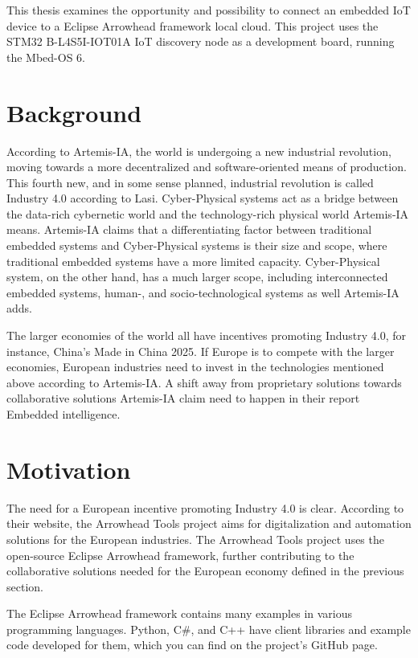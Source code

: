 This thesis examines the opportunity and possibility to connect an embedded IoT device to a Eclipse Arrowhead framework local cloud.
This project uses the STM32 B-L4S5I-IOT01A IoT discovery node as a development board, running the Mbed-OS 6. 
\section{Background}
According to Artemis-IA, the world is undergoing a new industrial revolution, moving towards a more decentralized and software-oriented means of production\cite{Artemis2021}.
This fourth new, and in some sense planned, industrial revolution is called Industry 4.0 according to Lasi\cite{Lasi2014}. 
Cyber-Physical systems act as a bridge between the data-rich cybernetic world and the technology-rich physical world Artemis-IA means\cite{Artemis2021}.
Artemis-IA claims that a differentiating factor between traditional embedded systems and Cyber-Physical systems is their size and scope, where traditional embedded systems have a more limited capacity.
Cyber-Physical system, on the other hand, has a much larger scope, including interconnected embedded systems, human-, and socio-technological systems as well Artemis-IA adds.

The larger economies of the world all have incentives promoting Industry 4.0, for instance, China’s Made in China 2025.
If Europe is to compete with the larger economies, European industries need to invest in the technologies mentioned above according to Artemis-IA\cite{Artemis2021}.
A shift away from proprietary solutions towards collaborative solutions  Artemis-IA claim need to happen in their report Embedded intelligence. 

\section{Motivation}
The need for a European incentive promoting Industry 4.0 is clear. 
According to their website, the Arrowhead Tools project aims for digitalization and automation solutions for the European industries\cite{AT2021}.
The Arrowhead Tools project uses the open-source Eclipse Arrowhead framework, further contributing to the collaborative solutions needed for the European economy defined in the previous section\cite{Github2021}.

The Eclipse Arrowhead framework contains many examples in various programming languages.
Python, C\#, and C++ have client libraries and example code developed for them, which you can find on the project’s GitHub page.\cite{AC2021} 

